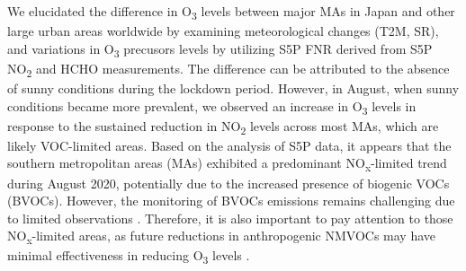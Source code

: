 We elucidated the difference in O\textsubscript{3} levels between major MAs in Japan and other large urban areas worldwide by examining meteorological changes (T2M, SR), and variations in O\textsubscript{3} precusors levels by utilizing S5P FNR derived from S5P NO\textsubscript{2} and HCHO measurements. The difference can be attributed to the absence of sunny conditions during the lockdown period. However, in August, when sunny conditions became more prevalent, we observed an increase in O\textsubscript{3} levels in response to the sustained reduction in NO\textsubscript{2} levels across most MAs, which are likely VOC-limited areas. Based on the analysis of S5P data, it appears that the southern metropolitan areas (MAs) exhibited a predominant NO\textsubscript{x}-limited trend during August 2020, potentially due to the increased presence of biogenic VOCs (BVOCs). However, the monitoring of BVOCs emissions remains challenging due to limited observations \citep{tani2021exchanges,ito2021terrestrial}. Therefore, it is also important to pay attention to those NO\textsubscript{x}-limited areas, as future reductions in anthropogenic NMVOCs may have minimal effectiveness in reducing O\textsubscript{3} levels \citep{akimoto2022rethinking}. \par

